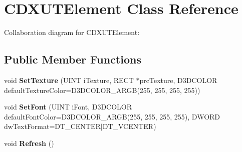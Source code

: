 \hypertarget{class_c_d_x_u_t_element}{\section{C\+D\+X\+U\+T\+Element Class Reference}
\label{class_c_d_x_u_t_element}
}


Collaboration diagram for C\+D\+X\+U\+T\+Element\+:
\subsection*{Public Member Functions}
\begin{DoxyCompactItemize}
\item 
\hypertarget{class_c_d_x_u_t_element_ac12fafe3f0d7f946298f4cd7b7a85800}{void {\bfseries Set\+Texture} (U\+I\+N\+T i\+Texture, R\+E\+C\+T $\ast$prc\+Texture, D3\+D\+C\+O\+L\+O\+R default\+Texture\+Color=D3\+D\+C\+O\+L\+O\+R\+\_\+\+A\+R\+G\+B(255, 255, 255, 255))}\label{class_c_d_x_u_t_element_ac12fafe3f0d7f946298f4cd7b7a85800}

\item 
\hypertarget{class_c_d_x_u_t_element_a34b6abc34f58b0378e2b1030c0f1f674}{void {\bfseries Set\+Font} (U\+I\+N\+T i\+Font, D3\+D\+C\+O\+L\+O\+R default\+Font\+Color=D3\+D\+C\+O\+L\+O\+R\+\_\+\+A\+R\+G\+B(255, 255, 255, 255), D\+W\+O\+R\+D dw\+Text\+Format=D\+T\+\_\+\+C\+E\+N\+T\+E\+R$\vert$D\+T\+\_\+\+V\+C\+E\+N\+T\+E\+R)}\label{class_c_d_x_u_t_element_a34b6abc34f58b0378e2b1030c0f1f674}

\item 
\hypertarget{class_c_d_x_u_t_element_a835872a666a7a38f13a02a74090d5003}{void {\bfseries Refresh} ()}\label{class_c_d_x_u_t_element_a835872a666a7a38f13a02a74090d5003}

\end{DoxyCompactItemize}
